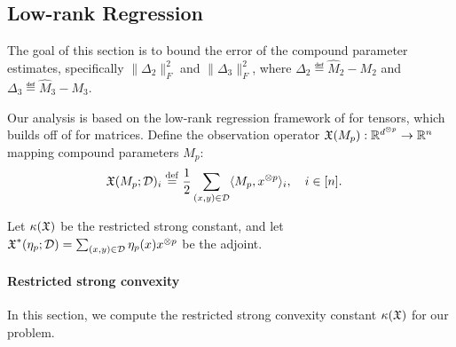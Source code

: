 \subsection{Low-rank Regression}
\label{sec:regression}

The goal of this section is to bound the error of
the compound parameter estimates,
specifically $\|\Delta_2\|_F^2$ and $\|\Delta_3\|_F^2$,
where $\Delta_2 \eqdef \hat M_2 - M_2$
and $\Delta_3 \eqdef \hat M_3 - M_3$.

Our analysis is based on the low-rank regression framework of
\citet{Tomioka2011} for tensors, which builds off of
\citet{NegahbanWainwright2009} for matrices.
Define the observation operator $\operatorname{\mathfrak{X}}(M_p) : \mathbb{R}^{d^{\otimes p}} \to \mathbb{R}^{n}$
mapping compound parameters $M_p$:
\begin{align}
  \operatorname{\mathfrak{X}}(M_p; \mathcal{D})_i &\stackrel{\rm def}{=} \frac12 \sum_{(x,y) \in \mathcal{D}} \langle M_p, x^{\otimes p} \rangle_i, \quad i  \in [n].
\end{align}

Let $\kappa(\operatorname{\mathfrak{X}})$ be the restricted strong constant,
and let $\operatorname{\mathfrak{X}}^*(\eta_p; \mathcal{D}) = \sum_{(x,y) \in \mathcal{D}} \eta_p(x) x^{\otimes p}$
be the adjoint.

\paragraph{Restricted strong convexity}

In this section, we compute the restricted strong convexity constant
$\kappa(\operatorname{\mathfrak{X}})$ for our problem.




